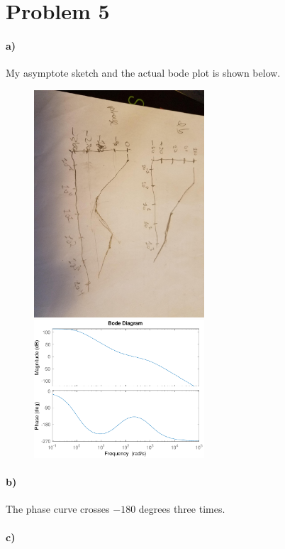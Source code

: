 \documentclass[12pt]{article}
\begin{document}
\section*{Problem 5}

\paragraph{a)}

My asymptote sketch and the actual bode plot is shown below.
\begin{figure}[H]
    \begin{center}
        \includegraphics[width=2.5in]{problem5a.jpg}
        \includegraphics[width=2.5in]{problem5a.pdf}
    \end{center}
\end{figure}

\paragraph{b)}

The phase curve crosses \(-180\) degrees three times.

\paragraph{c)}
\end{document}

